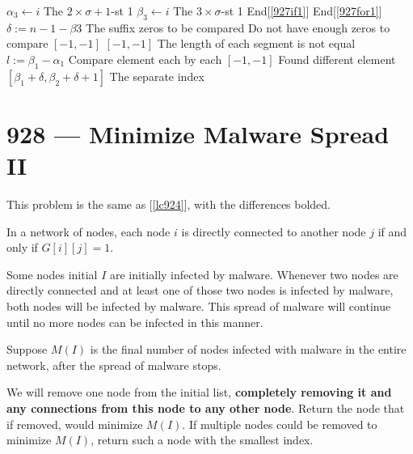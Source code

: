 \begin{algorithm}[H]
\begin{algorithmic}[1]
\State $\alpha_3 \gets i$ \Comment The $2\times\sigma+1$-st 1
\EndIf
{}
\State $\beta_3 \gets i$ \Comment The $3\times\sigma$-st 1
\EndIf
\EndIf \Comment End[\ref{927if1}]
\EndFor \Comment End[\ref{927for1}]
\State $\delta := n-1-\beta3$ \Comment The suffix zeros to be compared
 \Comment Do not have enough zeros to compare
\State \Return $[-1,-1]$
\EndIf
{}
\State \Return $[-1,-1]$ \Comment The length of each segment is not equal
\EndIf
\State $l:=\beta_1 - \alpha_1$
 \Comment Compare element each by each
\State \Return $[-1,-1]$ \Comment Found different element
\EndIf
\EndFor
\State \Return $[\beta_1+\delta, \beta_2+\delta+1]$ \Comment The separate index
\EndProcedure
\end{algorithmic}
\end{algorithm}

\section{928 --- Minimize Malware Spread II}
This problem is the same as [\ref{lc924}], with the differences bolded.
\par
In a network of nodes, each node $i$ is directly connected to another node $j$ if and only if $G[i][j] = 1$.
\par
Some nodes initial $I$ are initially infected by malware.  Whenever two nodes are directly connected and at least one of those two nodes is infected by malware, both nodes will be infected by malware.  This spread of malware will continue until no more nodes can be infected in this manner.
\par
Suppose $M(I)$ is the final number of nodes infected with malware in the entire network, after the spread of malware stops.
\par
We will remove one node from the initial list, \textbf{completely removing it and any connections from this node to any other node}.  Return the node that if removed, would minimize $M(I)$.  If multiple nodes could be removed to minimize $M(I)$, return such a node with the smallest index.
